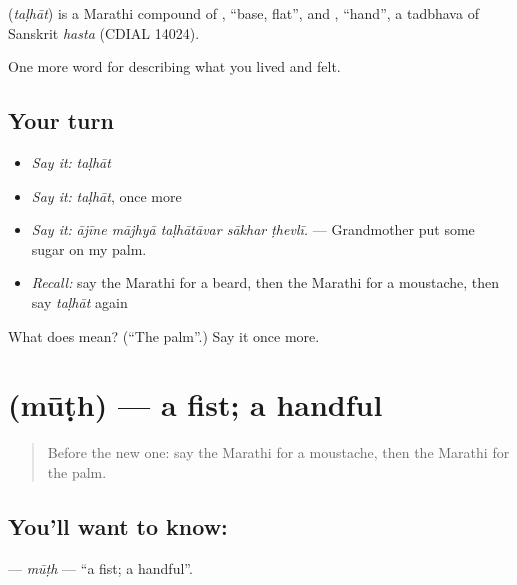 \begin{cousinweb}
\textbf{} (\emph{taḷhāt}) is a Marathi compound of , \textquotedblleft{}base, flat\textquotedblright{}, and , \textquotedblleft{}hand\textquotedblright{}, a tadbhava of Sanskrit \emph{hasta} (CDIAL 14024).
\end{cousinweb}

\begin{grammarlens}[title={What you've built}]
One more word for describing what you lived and felt.
\end{grammarlens}

\subsection*{Your turn}
\begin{itemize}
\raggedright
  \item \emph{Say it:} \emph{taḷhāt}
  \item \emph{Say it:} \emph{taḷhāt}, once more
  \item \emph{Say it:} \emph{ājīne mājhyā taḷhātāvar sākhar ṭhevlī.} — Grandmother put some sugar on my palm.
  \item \emph{Recall:} say the Marathi for a beard, then the Marathi for a moustache, then say \emph{taḷhāt} again
\end{itemize}

\begin{tcolorbox}[breakable,colback=teal!4,colframe=teal!35!black,title={Before you move on}]
What does  mean? (\textquotedblleft{}The palm\textquotedblright{}.) Say it once more.
\end{tcolorbox}
\section[\texorpdfstring{\mr{मूठ} (mūṭh)}{मूठ (mūṭh)}]{ (mūṭh) — a fist; a handful}

\label{lesson:MR-C477-muth}



\begin{quote}
Before the new one: say the Marathi for a moustache, then the Marathi for the palm.
\end{quote}

\subsection*{You'll want to know: }
\textbf{} — \emph{mūṭh} — \textquotedblleft{}a fist; a handful\textquotedblright{}.

